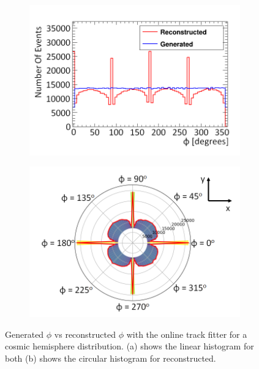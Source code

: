 \begin{figure}[!h]
\centering
\begin{subfigure}{.5\textwidth}
  \centering
  \includegraphics[width=\linewidth]{Chapter6/Figs/Raster/hemispherePhi_linHistMedText.png}
  \captionsetup{width=.9\linewidth}
  \caption{} 
  \label{subFig:phiGenVsRecoHem}
\end{subfigure}%
\begin{subfigure}{.5\textwidth}
  \centering
\includegraphics[width=\linewidth]{Chapter6/Figs/Raster/hemispherePhi_cirHistMedText.png}
  \captionsetup{width=.9\linewidth}
  \caption{}
  \label{subFig:cirPhiGenVsRecoHem}
\end{subfigure}
\caption{Generated $\phi$ vs reconstructed $\phi$ with the online track fitter for a cosmic hemisphere distribution. (a) shows the linear histogram for both (b) shows the circular histogram for reconstructed.}
\label{fig:linCirPhiGenVsRecoHem}
\end{figure}

